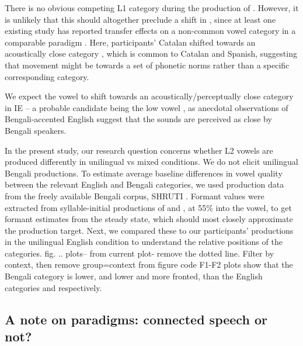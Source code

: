 \documentclass[12 pt]{article}
\newcommand{\nt}[1]{\textipa{[#1]}} %
\begin{document}

There is no obvious competing L1 category during the production of \nt{2}. However, it is unlikely that this should altogether preclude a shift in \nt{2}, since at least one existing study has reported transfer effects on a non-common vowel category in a comparable paradigm \citep{simonet2014phonetic}. Here, participants' Catalan \nt{O} shifted towards an acoustically close category \nt{o}, which is common to Catalan and Spanish, suggesting that movement might be towards a set of phonetic norms rather than a specific corresponding category. 

We expect the vowel \nt{2} to shift towards an acoustically/perceptually close category in IE -- a probable candidate being the low vowel \nt{a:}, as anecdotal observations of Bengali-accented English suggest that the sounds are perceived as close by Bengali speakers. 


In the present study, our research question concerns whether L2 vowels are produced differently in unilingual vs mixed conditions. We do not elicit unilingual Bengali productions. To estimate average baseline differences in vowel quality between the relevant English and Bengali categories, we used production data from the freely available Bengali corpus, SHRUTI \citep{shruticorpus}. Formant values were extracted from syllable-initial productions of \nt{\ae} and \nt{a:}, at 55\% into the vowel, to get formant estimates from the steady state, which should most closely approximate the production target. Next, we compared these to our participants' productions in the unilingual English condition to understand the relative positions of the categories. \alert{fig. .. plots-- from current plot- remove the dotted line. Filter by context, then remove group=context from figure code} F1-F2 plots show that the Bengali category \nt{\ae} is lower, and \nt{a:} lower and more fronted, than the English categories \nt{\ae} and \nt{2} respectively. 

\subsection{A note on paradigms: connected speech or not?} \label{paradigms}
\end{document}
